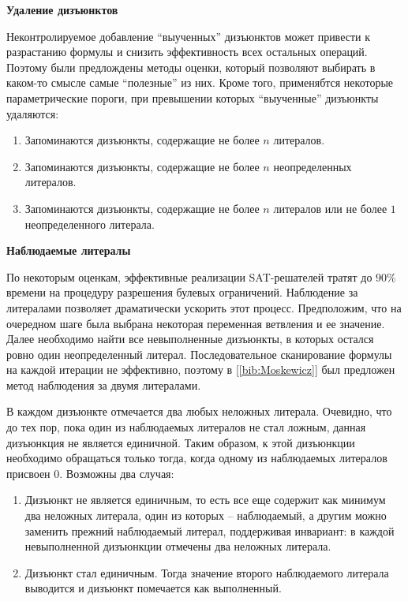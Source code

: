 \textbf{Удаление дизъюнктов}

Неконтролируемое добавление \enquote{выученных} дизъюнктов может привести к разрастанию формулы и снизить эффективность всех остальных операций. Поэтому были предлождены методы оценки, который позволяют выбирать в каком-то смысле самые \enquote{полезные} из них. Кроме того, применябтся некоторые параметрические пороги, при превышении которых \enquote{выученные} дизъюнкты удаляются:

\begin{enumerate}[leftmargin=1cm,topsep=0pt,itemsep=-1ex,partopsep=1ex,parsep=1ex,label=\arabic{*}.]

\item Запоминаются дизъюнкты, содержащие не более $n$ литералов.

\item Запоминаются дизъюнкты, содержащие не более $n$ неопределенных литералов.

\item Запоминаются дизъюнкты, содержащие не более $n$ литералов или не более $1$ неопределенного литерала.

\end{enumerate}

\textbf{Наблюдаемые литералы}

По некоторым оценкам, эффективные реализации SAT-решателей тратят до $90\%$ времени на процедуру разрешения булевых ограничений. Наблюдение за литералами позволяет драматически ускорить этот процесс. Предположим, что на очередном шаге была выбрана некоторая переменная ветвления и ее значение. Далее необходимо найти все невыполненные дизъюнкты, в которых остался ровно один неопределенный литерал. Последовательное сканирование формулы на каждой итерации не эффективно, поэтому в [\ref{bib:Moskewicz}] был предложен метод наблюдения за двумя литералами.

В каждом дизъюнкте отмечается два любых неложных литерала. Очевидно, что до тех пор, пока один из наблюдаемых литералов не стал ложным, данная дизъюнкция не является единичной. Таким образом, к этой дизъюнкции необходимо обращаться только тогда, когда одному из наблюдаемых литералов присвоен $0$. Возможны два случая:

\begin{enumerate}[leftmargin=1cm,topsep=0pt,itemsep=-1ex,partopsep=1ex,parsep=1ex,label=\arabic{*}.]

\item Дизъюнкт не является единичным, то есть все еще содержит как минимум два неложных литерала, один из которых – наблюдаемый, а другим можно заменить прежний наблюдаемый литерал, поддерживая инвариант: в каждой невыполненной дизъюнкции отмечены два неложных литерала.

\item Дизъюнкт стал единичным. Тогда значение второго наблюдаемого литерала выводится и дизъюнкт помечается как выполненный.

\end{enumerate}

